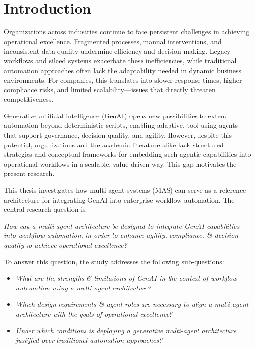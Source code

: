 \section{Introduction}\label{sec:intro}
Organizations across industries continue to face persistent challenges in achieving operational excellence. Fragmented processes, manual interventions, and inconsistent data quality undermine efficiency and decision-making. Legacy workflows and siloed systems exacerbate these inefficiencies, while traditional automation approaches often lack the adaptability needed in dynamic business environments. For companies, this translates into slower response times, higher compliance risks, and limited scalability—issues that directly threaten competitiveness.

Generative artificial intelligence (GenAI) opens new possibilities to extend automation beyond deterministic scripts, enabling adaptive, tool-using agents that support governance, decision quality, and agility. However, despite this potential, organizations and the academic literature alike lack structured strategies and conceptual frameworks for embedding such agentic capabilities into operational workflows in a scalable, value-driven way. This gap motivates the present research.

This thesis investigates how multi-agent systems (MAS) can serve as a reference architecture for integrating GenAI into enterprise workflow automation. The central research question is:

\vspace{0.5\baselineskip}
\emph{How can a multi-agent architecture be designed to integrate GenAI capabilities into workflow automation, in order to enhance agility, compliance, \& decision quality to achieve operational excellence?}
\vspace{0.5\baselineskip}

To answer this question, the study addresses the following sub-questions:
\begin{itemize}
    \item \emph{What are the strengths \& limitations of GenAI in the context of workflow automation using a multi-agent architecture?}
    \item \emph{Which design requirements \& agent roles are necessary to align a multi-agent architecture with the goals of operational excellence?}
    \item \emph{Under which conditions is deploying a generative multi-agent architecture justified over traditional automation approaches?}
\end{itemize}

